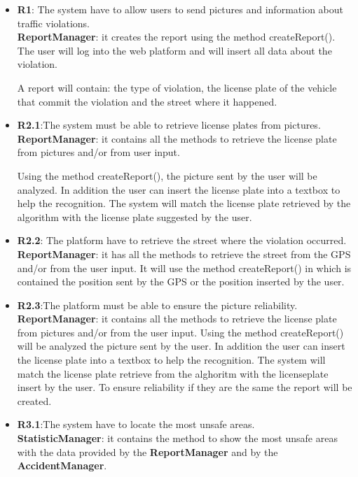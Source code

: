 \begin{itemize}
	\item
	\textbf{R1}: The system have to allow users to send pictures and information about traffic violations. \\
	\textbf{ReportManager}: it creates the report using the method createReport(). The user will log into the web platform and will insert all data about the violation. 
	
	A report will contain: the type of violation, the license plate of the vehicle that commit the violation and the street where it happened.
	
	\item 
	\textbf{R2.1}:The system must be able to retrieve license plates from pictures. \\
	\textbf{ReportManager}: it contains all the methods to retrieve the license plate from pictures and/or from user input. 
	
	Using the method createReport(), the picture sent by the user will be analyzed. In addition the user can insert the license plate into a textbox to help the recognition. The system will match the license plate retrieved by the algorithm with the license plate suggested by the user. 
	
	\item 
	\textbf{R2.2}: The platform have to retrieve the street where the violation occurred. \\
	\textbf{ReportManager}: it has all the methods to retrieve the street from the GPS and/or from the user input. It will use the method createReport() in which is contained the position sent by the GPS or the position inserted by the user.
	
	\item 
	\textbf{R2.3}:The platform must be able to ensure the picture reliability. \\
	\textbf{ReportManager}: it contains all the methods to retrieve the license plate from pictures and/or from the user input. Using the method createReport() will be analyzed the picture sent by the user. In addition the user can insert the license plate into a textbox to help the recognition. The system will match the license plate retrieve from the alghoritm with the licenseplate insert by the user. To ensure reliability if they are the same the report will be created.
	
	\item 
	\textbf{R3.1}:The system have to locate the most unsafe areas. \\
	\textbf{StatisticManager}: it contains the method to show the most unsafe areas with the data provided by the \textbf{ReportManager} and by the \textbf{AccidentManager}.
	

\end{itemize}
